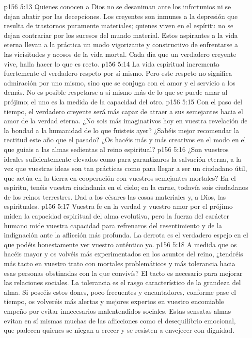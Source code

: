 \vs p156 5:13 Quienes conocen a Dios no se desaniman ante los infortunios ni se dejan abatir por las decepciones. Los creyentes son inmunes a la depresión que resulta de trastornos puramente materiales; quienes viven en el espíritu no se dejan contrariar por los sucesos del mundo material. Estos aspirantes a la vida eterna llevan a la práctica un modo vigorizante y constructivo de enfrentarse a las vicisitudes y acosos de la vida mortal. Cada día que un verdadero creyente vive, halla  hacer lo que es recto.
\vs p156 5:14 La vida espiritual incrementa fuertemente el verdadero respeto por sí mismo. Pero este respeto no significa admiración por uno mismo, sino que se conjuga con el amor y el servicio a los demás. No es posible respetarse a sí mismo más de lo que se puede amar al prójimo; el uno es la medida de la capacidad del otro.
\vs p156 5:15 Con el paso del tiempo, el verdadero creyente será más capaz de atraer a sus semejantes hacia el amor de la verdad eterna. ¿No sois más imaginativos hoy en vuestra revelación de la bondad a la humanidad de lo que fuisteis ayer? ¿Sabéis mejor recomendar la rectitud este año que el pasado? ¿Os hacéis más y más creativos en el modo en el que guiais a las almas sedientas al reino espiritual?
\vs p156 5:16 ¿Son vuestros ideales suficientemente elevados como para garantizaros la salvación eterna, a la vez que vuestras ideas son tan prácticas como para llegar a ser un ciudadano útil, que actúa en la tierra en cooperación con vuestros semejantes mortales? En el espíritu, tenéis vuestra ciudadanía en el cielo; en la carne, todavía sois ciudadanos de los reinos terrestres. Dad a los césares las cosas materiales y, a Dios, las espirituales.
\vs p156 5:17 Vuestra fe en la verdad y vuestro amor por el prójimo miden la capacidad espiritual del alma evolutiva, pero la fuerza del carácter humano mide vuestra capacidad para refrenaros del resentimiento y de la indignación ante la aflicción más profunda. La derrota es el verdadero espejo en el que podéis honestamente ver vuestro auténtico yo.
\vs p156 5:18 A medida que os hacéis mayor y os volvéis más experimentados en los asuntos del reino, ¿tendréis más tacto en vuestro trato con mortales problemáticos y más tolerancia hacia esas personas obstinadas con la que convivís? El tacto es necesario para mejorar las relaciones sociales. La tolerancia es el rasgo característico de la grandeza del alma. Si poseéis estos dones, poco frecuentes y encantadores, conforme pase el tiempo, os volveréis más alertas y mejores expertos en vuestro encomiable empeño por evitar innecesarios malentendidos sociales. Estas sensatas almas evitan en sí mismas muchas de las aflicciones como el desequilibrio emocional, que padecen quienes se niegan a crecer y se resisten a envejecer con dignidad.
